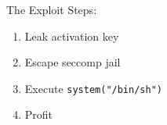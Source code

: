 \documentclass[usenames,dvipsnames]{beamer}
\begin{document}
\begin{frame}{The Exploit}
Steps:
\begin{enumerate}
\item Leak activation key
\item Escape seccomp jail
\item Execute \lstinline{system("/bin/sh")}
\item Profit
\end{enumerate}
\end{frame}
\end{document}
